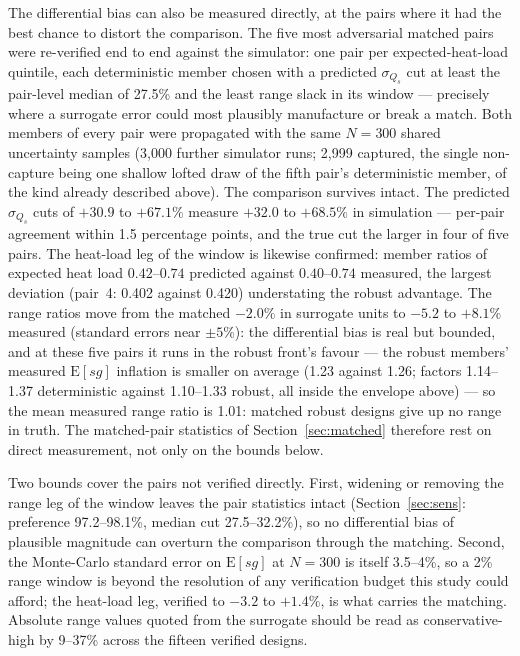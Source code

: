 The differential bias can also be measured directly, at the pairs where
it had the best chance to distort the comparison. The five most
adversarial matched pairs were re-verified end to end against the
simulator: one pair per expected-heat-load quintile, each deterministic
member chosen with a predicted $\sigma_{Q_s}$ cut at least the
pair-level median of 27.5\% and the least range slack in its window ---
precisely where a surrogate error could most plausibly manufacture or
break a match. Both members of every pair were propagated with the same
$N=300$ shared uncertainty samples (3{,}000 further simulator runs;
2{,}999 captured, the single non-capture being one shallow lofted draw
of the fifth pair's deterministic member, of the kind already described
above). The comparison survives intact. The predicted $\sigma_{Q_s}$
cuts of $+30.9$ to $+67.1\%$ measure $+32.0$ to $+68.5\%$ in simulation
--- per-pair agreement within 1.5 percentage points, and the true cut
the larger in four of five pairs. The heat-load leg of the window is
likewise confirmed: member ratios of expected heat load $0.42$--$0.74$
predicted against $0.40$--$0.74$ measured, the largest deviation
(pair~4: 0.402 against 0.420) understating the robust advantage. The
range ratios move from the matched $-2.0\%$ in surrogate units to
$-5.2$ to $+8.1\%$ measured (standard errors near $\pm 5\%$): the
differential bias is real but bounded, and at these five pairs it runs
in the robust front's favour --- the robust members' measured
$\mathrm{E}[sg]$ inflation is smaller on average (1.23 against 1.26;
factors 1.14--1.37 deterministic against 1.10--1.33 robust, all inside
the envelope above) --- so the mean measured range ratio is 1.01:
matched robust designs give up no range in truth. The matched-pair statistics
of Section~\ref{sec:matched} therefore rest on direct measurement, not
only on the bounds below.

Two bounds cover the pairs not verified directly. First, widening or
removing the range leg of the window leaves the pair statistics intact
(Section~\ref{sec:sens}: preference 97.2--98.1\%, median cut
27.5--32.2\%), so no differential bias of plausible magnitude can
overturn the comparison through the matching. Second, the Monte-Carlo
standard error on $\mathrm{E}[sg]$ at $N=300$ is itself 3.5--4\%, so a
2\% range window is beyond the resolution of any verification budget
this study could afford; the heat-load leg, verified to $-3.2$ to
$+1.4\%$, is what carries the matching. Absolute range values quoted
from the surrogate should be read as conservative-high by 9--37\%
across the fifteen verified designs.

